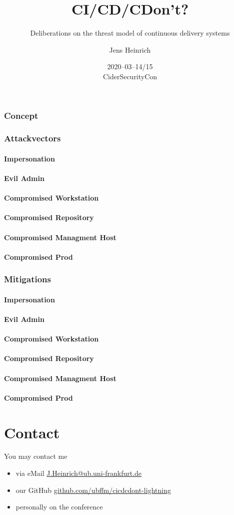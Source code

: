 \documentclass{beamer}
\title{CI/CD/CDon't?}
\subtitle{Deliberations on the threat model of continuous delivery systems}
\date[CiderSecurityCon]{2020--03--14/15\\CiderSecurityCon}
\institute[UBFFM]{\href{https://www.ub.uni-frankfurt.de}{Universit\"atsbibliothek Johann Christian Senckenberg}}
\author[J
	{\includegraphics[
		keepaspectratio,
		height=4pt
		]
		{icon.png}
		}
		]{Jens Heinrich}
\begin{document}
\begin{frame}
	\titlepage
\end{frame}

\begin{frame}
	\frametitle<1-1>{Concept}

	\frametitle<2-7>{Attackvectors}
	\framesubtitle<2-2>{Impersonation}
	\framesubtitle<3-3>{Evil Admin}
	\framesubtitle<4-4>{Compromised Workstation}
	\framesubtitle<5-5>{Compromised Repository}
	\framesubtitle<6-6>{Compromised Managment Host}
	\framesubtitle<7-7>{Compromised Prod}

	\frametitle<8-13>{Mitigations}
	\framesubtitle<8-8>{Impersonation}
	\framesubtitle<9-9>{Evil Admin}
	\framesubtitle<10-10>{Compromised Workstation}
	\framesubtitle<11-11>{Compromised Repository}
	\framesubtitle<12-12>{Compromised Managment Host}
	\framesubtitle<13-13>{Compromised Prod}
	
\end{frame}

\section{Contact}
\begin{frame}
	You may contact me
	\begin{itemize}
		\item via eMail \href{mailto://J.Heinrich@ub.uni-frankfurt.de}{\url{J.Heinrich@ub.uni-frankfurt.de}} \\
		\item our GitHub \href{https://github.com/ubffm/cicdcdont-lightning}{\url{github.com/ubffm/cicdcdont-lightning}} \\
		\item personally on the conference
	\end{itemize}
\end{frame}
\end{document}
